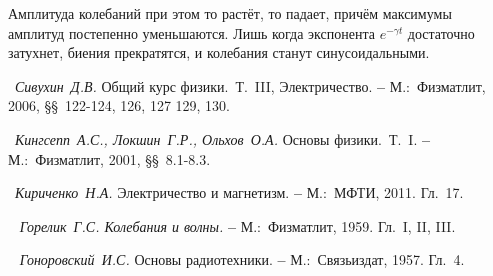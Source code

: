 Амплитуда колебаний при этом то растёт, то падает, причём максимумы амплитуд постепенно уменьшаются. Лишь когда экспонента $e^{-\gamma t}$ достаточно затухнет, биения прекратятся, и колебания станут синусоидальными.
\begin{lab:literature}
	\item~\emph{Сивухин~Д.В.} Общий курс физики.~Т.~III, Электричество. \textbf{--} М.:~Физматлит, 2006, \S\S~122-124, 126, 127 129, 130.
	\item~\emph{Кингсепп~А.С., Локшин~Г.Р., Ольхов~О.А.} Основы физики.~Т.~I. \textbf{--} М.:~Физматлит, 2001, \S\S~8.1-8.3.
	\item~\emph{Кириченко~Н.А.} Электричество и магнетизм. \textbf{--} М.:~МФТИ, 2011. Гл.~17.
	\item~\emph{ Горелик~Г.С. Колебания и волны.} \textbf{--} М.:~Физматлит, 1959. Гл.~I, II, III.
	\item~\emph{ Гоноровский~И.С.} Основы радиотехники. \textbf{--} М.:~Связьиздат, 1957. Гл.~4. 
\end{lab:literature}